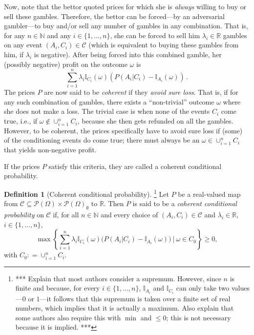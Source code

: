 \documentclass[10pt,a4paper]{paper}
\theoremstyle{definition}
\newtheorem{definition}{Definition}
\newcommand{\nats}{\mathbb{N}}
\newcommand{\reals}{\mathbb{R}}
\newcommand{\paths}{\Omega}
\newcommand{\power}{\mathcal{P}(\paths)}
\newcommand{\nonemptypower}{\power_{\emptyset}}
\newcommand{\ind}[1]{\mathbb{I}_{#1}}
\newcommand{\coloneqq}{:\!=}
\begin{document}
Now, note that the bettor quoted prices for which she is \emph{always} willing to buy or sell these gambles. Therefore, the bettor can be forced---by an adversarial gambler---to buy and/or sell any number of gambles in any combination. That is, for any $n\in\nats$ and any $i\in\{1,\ldots,n\}$, she can be forced to sell him $\lambda_i\in\reals$ gambles on any event $(A_i,C_i)\in\mathcal{C}$ (which is equivalent to buying these gambles from him, if $\lambda_i$ is negative). After being forced into this combined gamble, her (possibly negative) profit on the outcome $\omega$ is
\begin{equation*}
\sum_{i=1}^n\lambda_i\ind{C_i}(\omega)\left(P(A_i\vert C_i) - \ind{A_i}(\omega)\right)\,.
\end{equation*}
The prices $P$ are now said to be \emph{coherent} if they \emph{avoid sure loss}. That is, if for any such combination of gambles, there exists a ``non-trivial'' outcome $\omega$ where she does not make a loss. The trivial case is when none of the events $C_i$ come true, i.e., if $\omega\notin\cup_{i=1}^n C_i$, because she then gets refunded on all the gambles. However, to be coherent, the prices specifically have to avoid sure loss if (some) of the conditioning events do come true; there must always be an $\omega\in\cup_{i=1}^n C_i$ that yields non-negative profit.

If the prices $P$ satisfy this criteria, they are called a coherent conditional probability.

\begin{definition}[Coherent conditional probability]\label{def:coherence}\footnote{*** Explain that most authors consider a supremum. However, since $n$ is finite and because, for every $i\in\{1,\dots,n\}$, $\ind{A_i}$ and $\ind{C_i}$ can only take two values---$0$ or $1$---it follows that this supremum is taken over a finite set of real numbers, which implies that it is actually a maximum. Also explain that some authors also require this with $\min$ and $\leq0$; this is not necessary because it is implied. ***}
Let $P$ be a real-valued map from $\mathcal{C}\subseteq\power\times\nonemptypower$ to $\reals$. Then $P$ is said to be a \emph{coherent conditional probability} on $\mathcal{C}$ if, for all $n\in\mathbb{N}$ and every choice of $(A_i,C_i)\in\mathcal{C}$ and $\lambda_i\in\reals$, $i\in\{1,\dots,n\}$,
\begin{equation*}
\max\left\{\sum_{i=1}^n\lambda_i\ind{C_i}(\omega)\bigl(P(A_i\vert C_i)-\ind{A_i}(\omega)\bigr)~\Bigg\vert~\omega\in C_0\right\}\geq0,
\end{equation*}
with $C_0\coloneqq\cup_{i=1}^nC_i$.
\end{definition}
\end{document}
